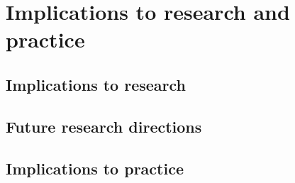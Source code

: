 \chapter{Implications to research and practice}
\label{chapter:Implications}

\section{Implications to research}



\section{Future research directions}


\section{Implications to practice}
